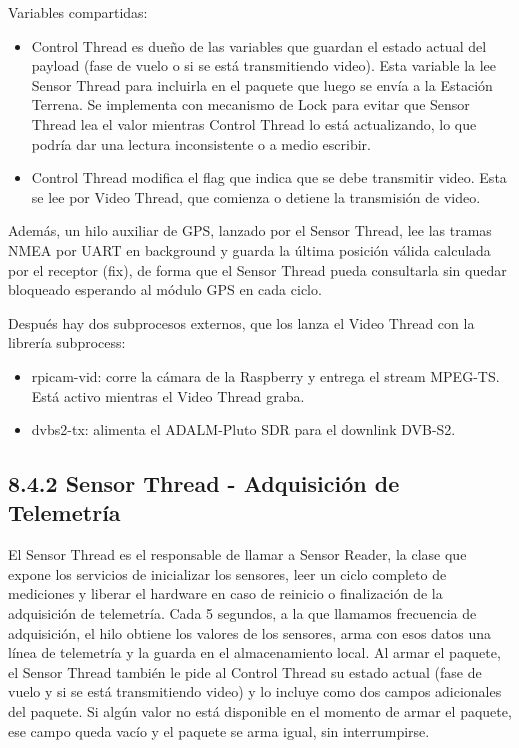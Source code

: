 \documentclass[12pt,a4paper]{article}
\begin{document}
Variables compartidas:

\begin{itemize}
\item
  Control Thread es dueño de las variables que guardan el estado actual del payload (fase de vuelo o si se está transmitiendo video). Esta variable la lee Sensor Thread para incluirla en el paquete que luego se envía a la Estación Terrena. Se implementa con mecanismo de Lock para evitar que Sensor Thread lea el valor mientras Control Thread lo está actualizando, lo que podría dar una lectura inconsistente o a medio escribir.
\item
  Control Thread modifica el flag que indica que se debe transmitir video. Esta se lee por Video Thread, que comienza o detiene la transmisión de video.
\end{itemize}

Además, un hilo auxiliar de GPS, lanzado por el Sensor Thread, lee las tramas NMEA por UART en background y guarda la última posición válida calculada por el receptor (fix), de forma que el Sensor Thread pueda consultarla sin quedar bloqueado esperando al módulo GPS en cada ciclo.

Después hay dos subprocesos externos, que los lanza el Video Thread con la librería subprocess:

\begin{itemize}
\item
  rpicam-vid: corre la cámara de la Raspberry y entrega el stream MPEG-TS. Está activo mientras el Video Thread graba.
\item
  dvbs2-tx: alimenta el ADALM-Pluto SDR para el downlink DVB-S2.
\end{itemize}

\subsection{8.4.2 Sensor Thread - Adquisición de Telemetría}\label{sensor-thread---adquisiciuxf3n-de-telemetruxeda}

El Sensor Thread es el responsable de llamar a Sensor Reader, la clase que expone los servicios de inicializar los sensores, leer un ciclo completo de mediciones y liberar el hardware en caso de reinicio o finalización de la adquisición de telemetría. Cada 5 segundos, a la que llamamos frecuencia de adquisición, el hilo obtiene los valores de los sensores, arma con esos datos una línea de telemetría y la guarda en el almacenamiento local. Al armar el paquete, el Sensor Thread también le pide al Control Thread su estado actual (fase de vuelo y si se está transmitiendo video) y lo incluye como dos campos adicionales del paquete. Si algún valor no está disponible en el momento de armar el paquete, ese campo queda vacío y el paquete se arma igual, sin interrumpirse.
\end{document}
